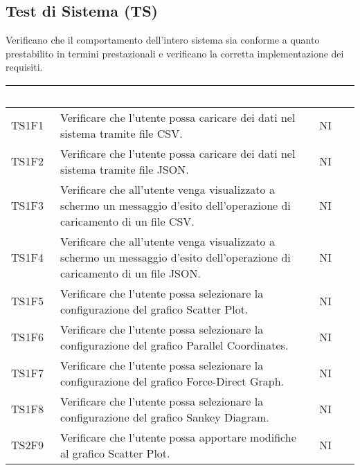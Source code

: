     \subsection{Test di Sistema (TS)} Verificano che il comportamento dell'intero sistema sia conforme a quanto prestabilito in termini prestazionali e verificano la corretta implementazione dei requisiti.
    \begin{center}
        \renewcommand\arraystretch{1.5}
        \centering
        \begin{longtable}{|p{1.5cm}|p{11cm}|p{1cm}|}
        \hline
        \rowcolor[HTML]{036400}
        \textcolor{white}{\textbf{Codice}} & \textcolor{white}{\textbf{Descrizione}} & \textcolor{white}{\textbf{Stato}} \\ \hline
            \rowcolor[HTML]{C0C0C0}
            TS1F1 & Verificare che l’utente possa caricare dei dati nel sistema tramite file CSV. & NI\\ \hline
            \rowcolor[HTML]{EFEFEF}
            TS1F2 & Verificare che l’utente possa caricare dei dati nel sistema tramite file JSON. & NI\\ \hline
            \rowcolor[HTML]{C0C0C0}
            TS1F3 & Verificare che all’utente venga visualizzato a schermo un messaggio d’esito dell’operazione di caricamento di un file CSV.& NI\\ \hline
            \rowcolor[HTML]{EFEFEF}
            TS1F4 & Verificare che all’utente venga visualizzato a schermo un messaggio d’esito dell’operazione di caricamento di un file JSON.& NI\\ \hline
            \rowcolor[HTML]{C0C0C0}
            TS1F5 & Verificare che l’utente possa selezionare la configurazione del grafico Scatter Plot. & NI\\ \hline
            \rowcolor[HTML]{EFEFEF}
            TS1F6 & Verificare che l’utente possa selezionare la configurazione del grafico Parallel Coordinates. & NI\\ \hline
            \rowcolor[HTML]{C0C0C0}
            TS1F7 & Verificare che l’utente possa selezionare la configurazione del grafico Force-Direct Graph. & NI\\ \hline
            \rowcolor[HTML]{EFEFEF}
            TS1F8 & Verificare che l’utente possa selezionare la configurazione del grafico Sankey Diagram. & NI\\ \hline
            \rowcolor[HTML]{C0C0C0}
            TS2F9 & Verificare che l’utente possa apportare modifiche al grafico Scatter Plot. & NI\\ \hline

\end{longtable}
\end{center}
